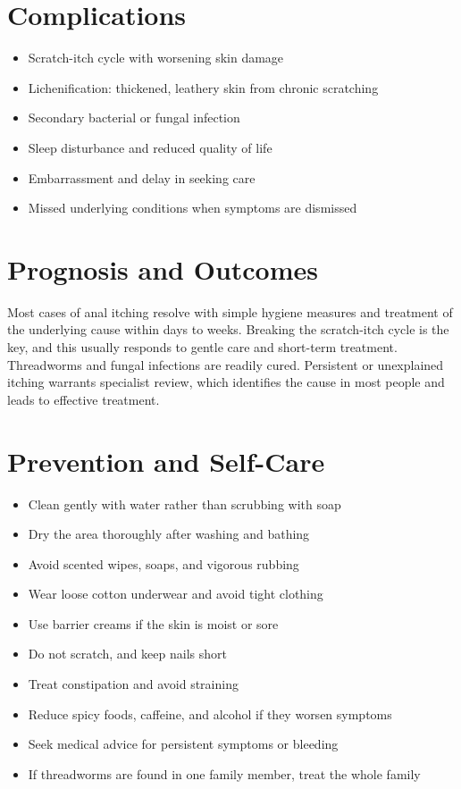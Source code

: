 \section*{Complications}
\begin{itemize}
    \item Scratch-itch cycle with worsening skin damage
    \item Lichenification: thickened, leathery skin from chronic scratching
    \item Secondary bacterial or fungal infection
    \item Sleep disturbance and reduced quality of life
    \item Embarrassment and delay in seeking care
    \item Missed underlying conditions when symptoms are dismissed
\end{itemize}

\section*{Prognosis and Outcomes}
Most cases of anal itching resolve with simple hygiene measures and treatment of the underlying cause within days to weeks. Breaking the scratch-itch cycle is the key, and this usually responds to gentle care and short-term treatment. Threadworms and fungal infections are readily cured. Persistent or unexplained itching warrants specialist review, which identifies the cause in most people and leads to effective treatment.

\section*{Prevention and Self-Care}
\begin{itemize}
    \item Clean gently with water rather than scrubbing with soap
    \item Dry the area thoroughly after washing and bathing
    \item Avoid scented wipes, soaps, and vigorous rubbing
    \item Wear loose cotton underwear and avoid tight clothing
    \item Use barrier creams if the skin is moist or sore
    \item Do not scratch, and keep nails short
    \item Treat constipation and avoid straining
    \item Reduce spicy foods, caffeine, and alcohol if they worsen symptoms
    \item Seek medical advice for persistent symptoms or bleeding
    \item If threadworms are found in one family member, treat the whole family
\end{itemize}

